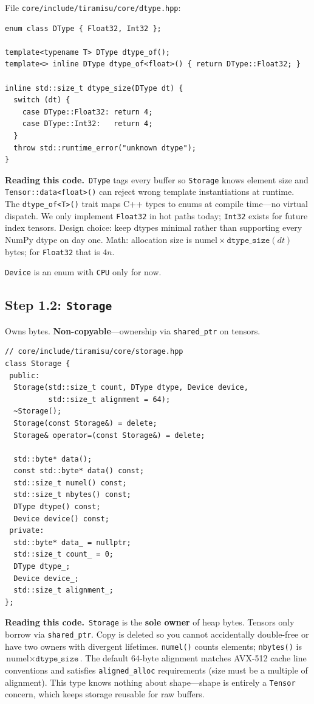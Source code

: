 \documentclass[11pt,a4paper]{article}
\newcommand{\explain}{\par\smallskip\noindent}
\newcommand{\exhead}{\textbf{Reading this code.}\ }
\begin{document}
File \texttt{core/include/tiramisu/core/dtype.hpp}:
\begin{lstlisting}[style=cpp]
enum class DType { Float32, Int32 };

template<typename T> DType dtype_of();
template<> inline DType dtype_of<float>() { return DType::Float32; }

inline std::size_t dtype_size(DType dt) {
  switch (dt) {
    case DType::Float32: return 4;
    case DType::Int32:   return 4;
  }
  throw std::runtime_error("unknown dtype");
}
\end{lstlisting}
\explain\exhead \texttt{DType} tags every buffer so \texttt{Storage} knows element size and
\texttt{Tensor::data<float>()} can reject wrong template instantiations at runtime. The
\texttt{dtype\_of<T>()} trait maps C++ types to enums at compile time---no virtual dispatch.
We only implement \texttt{Float32} in hot paths today; \texttt{Int32} exists for future index
tensors. Design choice: keep dtypes minimal rather than supporting every NumPy dtype on day
one. Math: allocation size is $\text{numel} \times \texttt{dtype\_size}(dt)$ bytes; for
\texttt{Float32} that is $4n$.

\texttt{Device} is an enum with \texttt{CPU} only for now.

\subsection{Step 1.2: \texttt{Storage}}

Owns bytes. \textbf{Non-copyable}---ownership via \texttt{shared\_ptr} on tensors.

\begin{lstlisting}[style=cpp]
// core/include/tiramisu/core/storage.hpp
class Storage {
 public:
  Storage(std::size_t count, DType dtype, Device device,
          std::size_t alignment = 64);
  ~Storage();
  Storage(const Storage&) = delete;
  Storage& operator=(const Storage&) = delete;

  std::byte* data();
  const std::byte* data() const;
  std::size_t numel() const;
  std::size_t nbytes() const;
  DType dtype() const;
  Device device() const;
 private:
  std::byte* data_ = nullptr;
  std::size_t count_ = 0;
  DType dtype_;
  Device device_;
  std::size_t alignment_;
};
\end{lstlisting}
\explain\exhead \texttt{Storage} is the \textbf{sole owner} of heap bytes. Tensors only borrow
via \texttt{shared\_ptr}. Copy is deleted so you cannot accidentally double-free or have two
owners with divergent lifetimes. \texttt{numel()} counts elements; \texttt{nbytes()} is
$\text{numel} \times \texttt{dtype\_size}$. The default 64-byte alignment matches AVX-512 cache
line conventions and satisfies \texttt{aligned\_alloc} requirements (size must be a multiple
of alignment). This type knows nothing about shape---shape is entirely a \texttt{Tensor} concern,
which keeps storage reusable for raw buffers.
\end{document}
